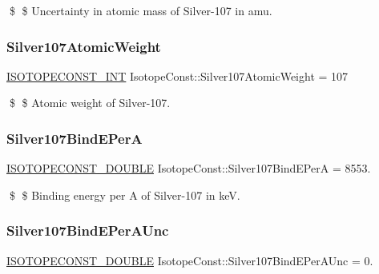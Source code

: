 \$ \$ Uncertainty in atomic mass of Silver-\/107 in amu. \mbox{\label{group___isotope_const-_silver-_ag107_ga134591111e08dd77e3bae05e431b7b84}} 
\subsubsection{\texorpdfstring{Silver107\+Atomic\+Weight}{Silver107AtomicWeight}}
{\footnotesize\ttfamily \mbox{\hyperlink{group___isotope_const-_macros_ga5f18360b3e99483a35c32d789e62621c}{I\+S\+O\+T\+O\+P\+E\+C\+O\+N\+S\+T\+\_\+\+I\+NT}} Isotope\+Const\+::\+Silver107\+Atomic\+Weight = 107}

\$ \$ Atomic weight of Silver-\/107. \mbox{\label{group___isotope_const-_silver-_ag107_ga13ff3cb7b5726956257835ebeb85ef51}} 
\subsubsection{\texorpdfstring{Silver107\+Bind\+E\+PerA}{Silver107BindEPerA}}
{\footnotesize\ttfamily \mbox{\hyperlink{group___isotope_const-_macros_ga8f45a7272ce02c0b4c65c44636ed719a}{I\+S\+O\+T\+O\+P\+E\+C\+O\+N\+S\+T\+\_\+\+D\+O\+U\+B\+LE}} Isotope\+Const\+::\+Silver107\+Bind\+E\+PerA = 8553.}

\$ \$ Binding energy per A of Silver-\/107 in keV. \mbox{\label{group___isotope_const-_silver-_ag107_gab7d0131a050b788694efb86735844c96}} 
\subsubsection{\texorpdfstring{Silver107\+Bind\+E\+Per\+A\+Unc}{Silver107BindEPerAUnc}}
{\footnotesize\ttfamily \mbox{\hyperlink{group___isotope_const-_macros_ga8f45a7272ce02c0b4c65c44636ed719a}{I\+S\+O\+T\+O\+P\+E\+C\+O\+N\+S\+T\+\_\+\+D\+O\+U\+B\+LE}} Isotope\+Const\+::\+Silver107\+Bind\+E\+Per\+A\+Unc = 0.}

